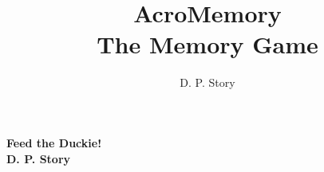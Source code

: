 \documentclass{article}
\title{AcroMemory\texorpdfstring{\\}{: }The Memory Game}
\author{D. P. Story}
\begin{document}
\maketitle

\begin{center}
\bfseries  \Large\color{blue} Feed the Duckie!\\[1ex]
\large D. P. Story
\end{center}

\begin{center}

\qquad
{}

\end{center}


\bigskip
\begin{center}

\tryItAgain{}{11bp}

\helpImage[\textSize{8}]{1in}\cgBdry[1em]
\messageBox{2in}{25pt}\cgBdry[1em]
\rolloverHelpButton{}{12pt}

\end{center}
\end{document}

